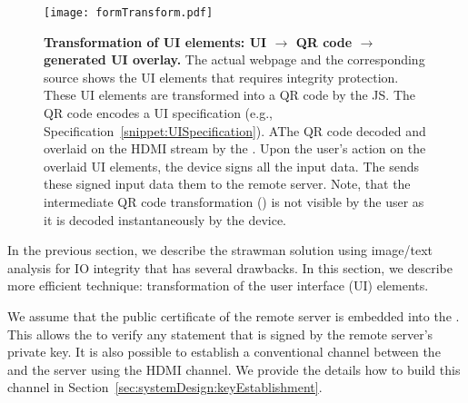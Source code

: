 \begin{figure*}[t]
\centering
\texttt{[image: formTransform.pdf]}
\caption{\textbf{Transformation of UI elements: UI $\rightarrow$ QR code $\rightarrow$ \device generated UI overlay.} \one The actual webpage and the corresponding \html source shows the UI elements that requires integrity protection. \two These UI elements are transformed into a QR code by the \name JS. The QR code encodes a UI specification (e.g., Specification~\ref{snippet:UISpecification}). \three AThe QR code decoded and overlaid on the HDMI stream by the \device. \four Upon the user's action on the overlaid UI elements, the device signs all the input data. \five The \device sends these signed input data them to the remote server. Note, that the intermediate QR code transformation (\two) is not visible by the user as it is decoded instantaneously by the device.}
\label{fig:transformation}
\end{figure*}

In the previous section, we describe the strawman solution using image/text analysis for IO integrity that has several drawbacks. In this section, we describe more efficient technique: transformation of the user interface (UI) elements.

We assume that the public certificate of the remote server is embedded into the \device. This allows the \device to verify any statement that is signed by the remote server's private key. It is also possible to establish a conventional \tls channel between the \device and the server using the HDMI channel. We provide the details how to build this \tls channel in Section~\ref{sec:systemDesign:keyEstablishment}.

